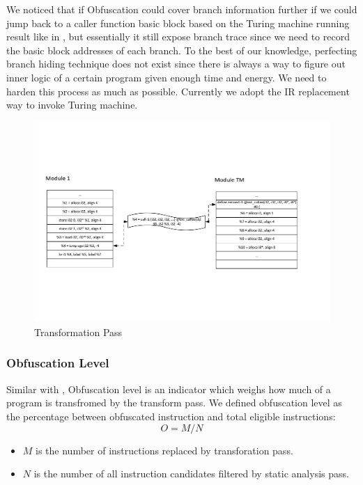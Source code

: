 \documentclass[lnicst]{svmultln}
\begin{document}
We noticed that if Obfuscation could cover branch information further if we could jump back to a caller function basic block based on the Turing machine running result like in \cite{Ma}, but essentially it still expose branch trace since we need to record the basic block addresses of each branch. To the best of our knowledge, perfecting branch hiding technique does not exist since there is always a way to figure out inner logic of a certain program given enough time and energy. We need to harden this process as much as possible. Currently we adopt the IR replacement way to invoke Turing machine.
\begin{figure}
 \includegraphics[width=\linewidth]{transform_pass.pdf}
 \caption{Transformation Pass}
 \label{Figure 6}
\end{figure}
\subsubsection{Obfuscation Level}
Similar with \cite{Trans}, Obfuscation level is an indicator which weighs how much of a program is transfromed by the transform pass. We defined obfuscation level as the percentage between obfuscated instruction and total eligible instructions:
\[ O = M / N \]
\begin{itemize}
  \item \(M\) is the number of instructions replaced by transforation pass.
  \item \(N\) is the number of all instruction candidates filtered by static analysis pass.
\end{itemize}
\end{document}

